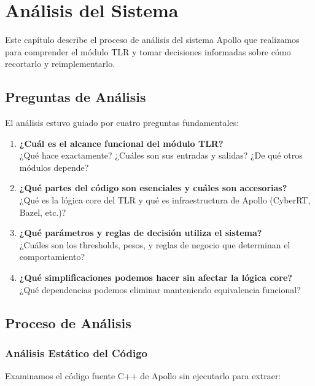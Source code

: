 \chapter{Análisis del Sistema}
\label{cap:analisis_apollo}

Este capítulo describe el proceso de análisis del sistema Apollo que realizamos para comprender el módulo TLR y tomar decisiones informadas sobre cómo recortarlo y reimplementarlo.

\section{Preguntas de Análisis}

El análisis estuvo guiado por cuatro preguntas fundamentales:

\begin{enumerate}
    \item \textbf{¿Cuál es el alcance funcional del módulo TLR?} \\
    ¿Qué hace exactamente? ¿Cuáles son sus entradas y salidas? ¿De qué otros módulos depende?

    \item \textbf{¿Qué partes del código son esenciales y cuáles son accesorias?} \\
    ¿Qué es la lógica core del TLR y qué es infraestructura de Apollo (CyberRT, Bazel, etc.)?

    \item \textbf{¿Qué parámetros y reglas de decisión utiliza el sistema?} \\
    ¿Cuáles son los thresholds, pesos, y reglas de negocio que determinan el comportamiento?

    \item \textbf{¿Qué simplificaciones podemos hacer sin afectar la lógica core?} \\
    ¿Qué dependencias podemos eliminar manteniendo equivalencia funcional?
\end{enumerate}

\section{Proceso de Análisis}

\subsection{Análisis Estático del Código}

Examinamos el código fuente C++ de Apollo sin ejecutarlo para extraer:

